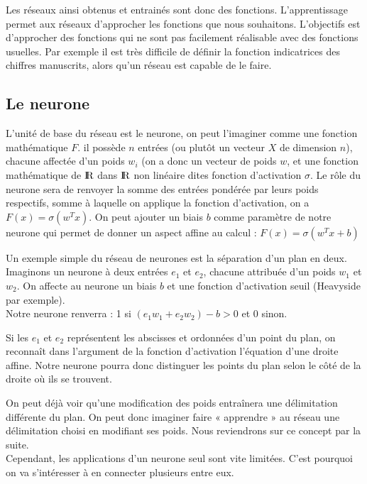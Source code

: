 Les réseaux ainsi obtenus et entrainés sont donc des fonctions. L'apprentissage permet aux réseaux d'approcher les fonctions que nous souhaitons. L'objectifs est d'approcher des fonctions qui ne sont pas facilement réalisable avec des fonctions usuelles. Par exemple il est très difficile de définir la fonction indicatrices des chiffres manuscrits, alors qu'un réseau est capable de le faire.

\subsection{Le neurone} %
\label{sub:le_neurone}
L’unité de base du réseau est le neurone, on peut l’imaginer comme une fonction mathématique $F$. il possède $n$ entrées (ou plutôt un vecteur $X$ de dimension $n$), chacune affectée d’un poids $w_i$ (on a donc un vecteur de poids $w$, et une fonction mathématique de $\textrm{I\kern-0.21emR}$ dans $\textrm{I\kern-0.21emR}$ non linéaire dites fonction d'activation $\sigma$. Le rôle du neurone sera de renvoyer la somme des entrées pondérée par leurs poids respectifs, somme à laquelle on applique la fonction d'activation, on a $F(x) = \sigma(w^T x)$. On peut ajouter un biais $b$ comme paramètre de notre neurone qui permet de donner un aspect affine au calcul : $F(x) = \sigma(w^T x + b)$

Un exemple simple du réseau de neurones est la séparation d’un plan en deux.\\
Imaginons un neurone à deux entrées $e_1$ et $e_2$, chacune attribuée d’un poids $w_1$ et $w_2$. On affecte au neurone un biais $b$ et une fonction d’activation seuil (Heavyside par exemple).\\
Notre neurone renverra : 1 si $(e_1w_1+e_2w_2) - b >0$ et 0 sinon.

Si les $e_1$ et $e_2$ représentent les abscisses et ordonnées d’un point du plan, on reconnaît dans l’argument de la fonction d’activation l’équation d’une droite affine. Notre neurone pourra donc distinguer les points du plan selon le côté de la droite où ils se trouvent.

On peut déjà voir qu’une modification des poids entraînera une délimitation différente du plan. On peut donc imaginer faire « apprendre » au réseau une délimitation choisi en modifiant ses poids. Nous reviendrons sur ce concept par la suite.\\
Cependant, les applications d’un neurone seul sont vite limitées. C’est pourquoi on va s’intéresser à en connecter plusieurs entre eux.

